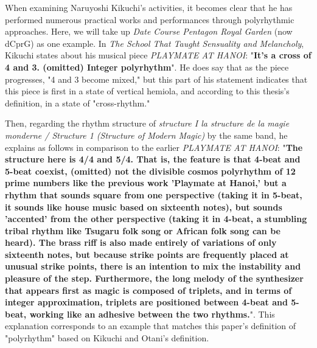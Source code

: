When examining Naruyoshi Kikuchi's activities, it becomes clear that he has performed numerous practical works and performances through polyrhythmic approaches. Here, we will take up \textit{Date Course Pentagon Royal Garden} (now dCprG) as one example. In \textit{The School That Taught Sensuality and Melancholy}, Kikuchi states about his musical piece \textit{PLAYMATE AT HANOI}\cite{works-kikuchi:01}: "\textbf{It's a cross of 4 and 3. (omitted) Integer polyrhythm}"\cite{kikuchi-ootani:01}. He does say that as the piece progresses, "4 and 3 become mixed," but this part of his statement indicates that this piece is first in a state of vertical hemiola, and according to this thesis's definition, in a state of "cross-rhythm."

Then, regarding the rhythm structure of \textit{structure I la structure de la magie monderne / Structure 1 (Structure of Modern Magic)}\cite{works-kikuchi:02} by the same band, he explains as follows in comparison to the earlier \textit{PLAYMATE AT HANOI}: "\textbf{The structure here is 4/4 and 5/4. That is, the feature is that 4-beat and 5-beat coexist, (omitted) not the divisible cosmos polyrhythm of 12 prime numbers like the previous work 'Playmate at Hanoi,' but a rhythm that sounds square from one perspective (taking it in 5-beat, it sounds like house music based on sixteenth notes), but sounds 'accented' from the other perspective (taking it in 4-beat, a stumbling tribal rhythm like Tsugaru folk song or African folk song can be heard). The brass riff is also made entirely of variations of only sixteenth notes, but because strike points are frequently placed at unusual strike points, there is an intention to mix the instability and pleasure of the step. Furthermore, the long melody of the synthesizer that appears first as magic is composed of triplets, and in terms of integer approximation, triplets are positioned between 4-beat and 5-beat, working like an adhesive between the two rhythms.}"\cite{kikuchi:01}. This explanation corresponds to an example that matches this paper's definition of "polyrhythm" based on Kikuchi and Otani's definition.

